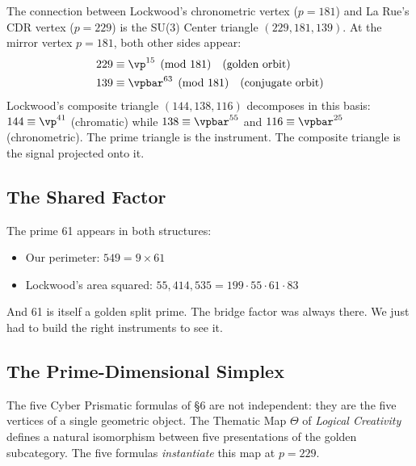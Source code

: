 The connection between Lockwood's chronometric vertex ($p = 181$) and La Rue's CDR vertex ($p = 229$) is the SU(3) Center triangle $(229, 181, 139)$. At the mirror vertex $p = 181$, both other sides appear:
\begin{align}
229 &\equiv \vp^{15} \pmod{181} \quad \text{(golden orbit)} \\
139 &\equiv \vpbar^{63} \pmod{181} \quad \text{(conjugate orbit)}
\end{align}
Lockwood's composite triangle $(144, 138, 116)$ decomposes in this basis: $144 \equiv \vp^{41}$ (chromatic) while $138 \equiv \vpbar^{55}$ and $116 \equiv \vpbar^{25}$ (chronometric). The prime triangle is the instrument. The composite triangle is the signal projected onto it.

\subsection{The Shared Factor}

The prime 61 appears in both structures:
\begin{itemize}
\item Our perimeter: $549 = 9 \times 61$
\item Lockwood's area squared: $55{,}414{,}535 = 199 \cdot 55 \cdot 61 \cdot 83$
\end{itemize}
And 61 is itself a golden split prime. The bridge factor was always there. We just had to build the right instruments to see it.


\subsection{The Prime-Dimensional Simplex}

The five Cyber Prismatic formulas of \S6 are not independent: they are the five vertices of a single geometric object. The Thematic Map $\Theta$ of \emph{Logical Creativity}~\cite{larue_lc} defines a natural isomorphism between five presentations of the golden subcategory. The five formulas \emph{instantiate} this map at $p = 229$.

